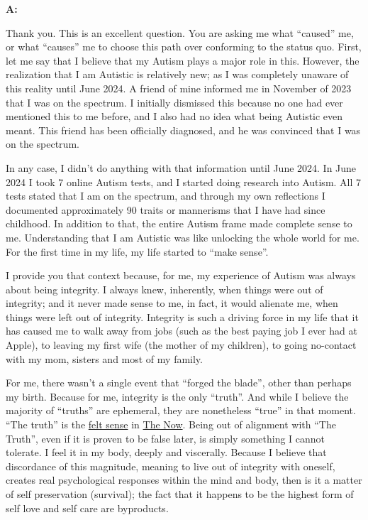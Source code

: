 \documentclass{article}
\begin{document}
\textbf{A:}

Thank you. This is an excellent question. You are asking me what ``caused'' me, or what ``causes'' me to choose this path over conforming to the status quo. First, let me say that I believe that my Autism plays a major role in this. However, the realization that I am Autistic is relatively new; as I was completely unaware of this reality until June 2024. A friend of mine informed me in November of 2023 that I was on the spectrum. I initially dismissed this because no one had ever mentioned this to me before, and I also had no idea what being Autistic even meant. This friend has been officially diagnosed, and he was convinced that I was on the spectrum.

In any case, I didn't do anything with that information until June 2024. In June 2024 I took 7 online Autism tests, and I started doing research into Autism. All 7 tests stated that I am on the spectrum, and through my own reflections I documented approximately 90 traits or mannerisms that I have had since childhood. In addition to that, the entire Autism frame made complete sense to me. Understanding that I am Autistic was like unlocking the whole world for me. For the first time in my life, my life started to ``make sense''.

I provide you that context because, for me, my experience of Autism was always about being integrity. I always knew, inherently, when things were out of integrity; and it never made sense to me, in fact, it would alienate me, when things were left out of integrity. Integrity is such a driving force in my life that it has caused me to walk away from jobs (such as the best paying job I ever had at Apple), to leaving my first wife (the mother of my children), to going no-contact with my mom, sisters and most of my family.

For me, there wasn't a single event that ``forged the blade'', other than perhaps my birth. Because for me, integrity is the only ``truth''. And while I believe the majority of ``truths'' are ephemeral, they are nonetheless ``true'' in that moment. ``The truth'' is the \hyperlink{gloss:felt_sense}{felt sense} in \hyperlink{gloss:the_now}{The Now}. Being out of alignment with ``The Truth'', even if it is proven to be false later, is simply something I cannot tolerate. I feel it in my body, deeply and viscerally. Because I believe that discordance of this magnitude, meaning to live out of integrity with oneself, creates real psychological responses within the mind and body, then is it a matter of self preservation (survival); the fact that it happens to be the highest form of self love and self care are byproducts.
\end{document}
